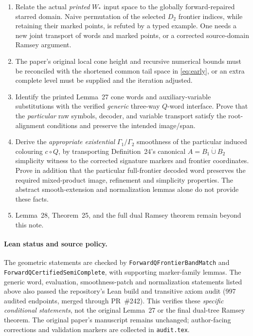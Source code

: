 \documentclass[11pt]{article}
\begin{document}
\begin{enumerate}[label=(\roman*)]
\item Relate the actual \emph{printed} \(W_*\) input
space to the globally forward-repaired starred domain.
Naive permutation of the selected \(D_2\) frontier
indices, while retaining their marked points,
is refuted by a typed example. One needs a new
joint transport of words and marked points, or a
corrected source-domain Ramsey argument.
\item The paper's original local cone height
and recursive numerical bounds must be reconciled
with the shortened common tail space in
\eqref{eq:early}, or an extra complete level
must be supplied and the iteration adjusted.
\item Identify the printed Lemma~27 cone words and
auxiliary-variable substitutions with the verified
\emph{generic} three-way \(Q\)-word interface.
Prove that the \emph{particular} raw symbols, decoder,
and variable transport satisfy the root-alignment
conditions and preserve the intended image/span.
\item Derive the \emph{appropriate existential}
\(\Gamma_1/\Gamma_2\) smoothness of the particular
induced colouring \(c\circ Q\), by transporting
Definition~24's canonical \(A=B_1\dot\cup B_2\)
simplicity witness to the corrected signature
markers and frontier coordinates.
Prove in addition that the particular full-frontier
decoded word preserves the required mixed-product
image, refinement and simplicity properties.
The abstract smooth-extension and normalization
lemmas alone do not provide these facts.
\item Lemma~28, Theorem~25, and the full dual
Ramsey theorem remain beyond this note.
\end{enumerate}

\paragraph{Lean status and source policy.}
The geometric statements are checked by
\texttt{ForwardQFrontierBandMatch} and
\texttt{ForwardQCertifiedSemiComplete}, with supporting
marker-family lemmas. The generic word, evaluation,
smoothness-patch and normalization statements listed
above also passed the repository's Lean build and
transitive axiom audit (997 audited endpoints,
merged through PR~\#242). This verifies these
\emph{specific conditional statements}, not the
original Lemma~27 or the final dual-tree Ramsey theorem.
The original paper's manuscript remains unchanged;
author-facing corrections and validation markers are
collected in \texttt{audit.tex}.
\end{document}
